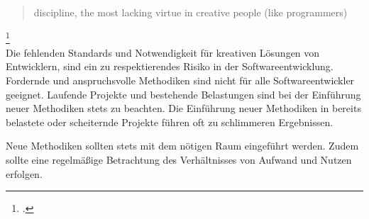 \blockquote {discipline, the most lacking virtue in creative people (like programmers)}\footcite[][S.167]{git-essentials-2017}
\vspace{1em}\\
Die fehlenden Standards und Notwendigkeit für kreativen Lösungen von Entwicklern, sind ein zu respektierendes Risiko in der Softwareentwicklung. Fordernde und anspruchsvolle Methodiken sind nicht für alle Softwareentwickler geeignet. Laufende Projekte und bestehende Belastungen sind bei der Einführung neuer Methodiken stets zu beachten. Die Einführung neuer Methodiken in bereits belastete oder scheiternde Projekte führen oft zu schlimmeren Ergebnissen.

Neue Methodiken sollten stets mit dem nötigen Raum eingeführt werden. Zudem sollte eine regelmäßige Betrachtung des Verhältnisses von Aufwand und Nutzen erfolgen.
